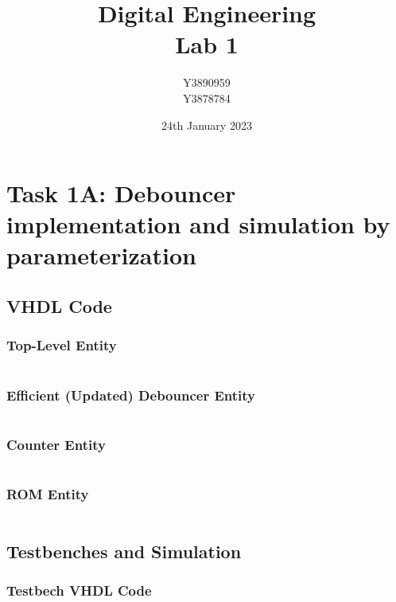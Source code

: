 \documentclass[11pt]{article}
\title{Digital Engineering\\Lab 1}
\author{Y3890959\\Y3878784}
\date{24th January 2023}
\begin{document}
\maketitle

\section*{Task 1A: Debouncer implementation and simulation by parameterization}

\subsection*{VHDL Code}

\subsubsection*{Top-Level Entity}
\inputminted{vhdl}{../../Lab1/Lab1.srcs/sources_1/imports/new/fibonacci_8bit_sequence.vhd}

\subsubsection*{Efficient (Updated) Debouncer Entity}
\inputminted{vhdl}{../../Lab1/Lab1.srcs/sources_1/new/efficient_debouncer.vhd}

\subsubsection*{Counter Entity}
\inputminted{vhdl}{../../Lab1/Lab1.srcs/sources_1/new/parameterizable_counter.vhd}

\subsubsection*{ROM Entity}
\inputminted{vhdl}{../../Lab1/Lab1.srcs/sources_1/imports/new/fibonacci_8bit_async_read_rom.vhd}



\subsection*{Testbenches and Simulation}

\subsubsection*{Testbech VHDL Code}
\inputminted{vhdl}{../../Lab1/Lab1.srcs/sim_1/imports/new/fibonacci_8bit_sequence_tb.vhd}
\end{document}
